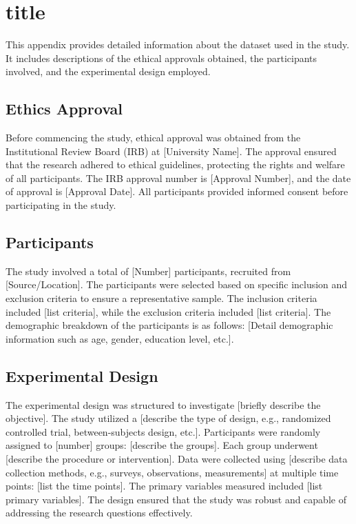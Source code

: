\renewcommand\listtablename{\normalsize\normalfont\centering\vspace*{-0.5 in} APPENDICES}
\iftablespage
{}
{}
\section{title}




This appendix provides detailed information about the dataset used in the study. It includes descriptions of the ethical approvals obtained, the participants involved, and the experimental design employed.

\subsection{Ethics Approval}
Before commencing the study, ethical approval was obtained from the Institutional Review Board (IRB) at [University Name]. The approval ensured that the research adhered to ethical guidelines, protecting the rights and welfare of all participants. The IRB approval number is [Approval Number], and the date of approval is [Approval Date]. All participants provided informed consent before participating in the study.

\subsection{Participants}
The study involved a total of [Number] participants, recruited from [Source/Location]. The participants were selected based on specific inclusion and exclusion criteria to ensure a representative sample. The inclusion criteria included [list criteria], while the exclusion criteria included [list criteria]. The demographic breakdown of the participants is as follows: [Detail demographic information such as age, gender, education level, etc.].

\subsection{Experimental Design}
The experimental design was structured to investigate [briefly describe the objective]. The study utilized a [describe the type of design, e.g., randomized controlled trial, between-subjects design, etc.]. Participants were randomly assigned to [number] groups: [describe the groups]. Each group underwent [describe the procedure or intervention]. Data were collected using [describe data collection methods, e.g., surveys, observations, measurements] at multiple time points: [list the time points]. The primary variables measured included [list primary variables]. The design ensured that the study was robust and capable of addressing the research questions effectively.


\clearpage




